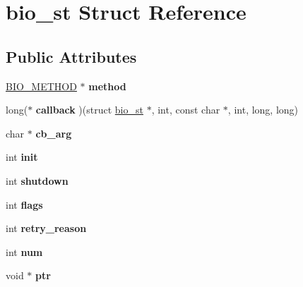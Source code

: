 \hypertarget{structbio__st}{}\section{bio\+\_\+st Struct Reference}
\label{structbio__st}
\subsection*{Public Attributes}
\begin{DoxyCompactItemize}
\item 
\mbox{\label{structbio__st_ac4bef031359b51902ddfb2a7aeaa4dd7}} 
\hyperlink{structbio__method__st}{B\+I\+O\+\_\+\+M\+E\+T\+H\+OD} $\ast$ {\bfseries method}
\item 
\mbox{\label{structbio__st_a6449aab690198cbecb3bc45d9cbf59ac}} 
long($\ast$ {\bfseries callback} )(struct \hyperlink{structbio__st}{bio\+\_\+st} $\ast$, int, const char $\ast$, int, long, long)
\item 
\mbox{\label{structbio__st_a50cdd0a5e46c7253bc6ab1cb37abeaca}} 
char $\ast$ {\bfseries cb\+\_\+arg}
\item 
\mbox{\label{structbio__st_a365cca316f1daf354096eec7dbf98102}} 
int {\bfseries init}
\item 
\mbox{\label{structbio__st_adafdb3d0f58c31b776525ddceec5068b}} 
int {\bfseries shutdown}
\item 
\mbox{\label{structbio__st_aa815fc844603d4a3fcf7abebfeb3f546}} 
int {\bfseries flags}
\item 
\mbox{\label{structbio__st_a4c3a2c24d7c41e8887762750b213e9f0}} 
int {\bfseries retry\+\_\+reason}
\item 
\mbox{\label{structbio__st_a3b769c998195a0f139bc68e1a36aaf09}} 
int {\bfseries num}
\item 
\mbox{\label{structbio__st_ad59e7884d7949dd931c76ac0d84c2ea5}} 
void $\ast$ {\bfseries ptr}
\item 
\mbox{\label{structbio__st_adf41b29002a5236e8112253dd9d8acbf}} 

\end{DoxyCompactItemize}
